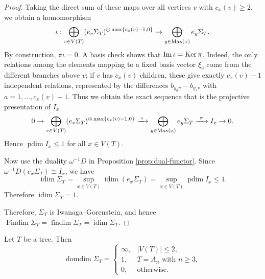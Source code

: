 \documentclass[a4paper,leqno]{amsart}
\begin{document}
\begin{proof}
Taking the direct sum of these maps over all vertices $v$ with $c_x(v)\geq 2$, we obtain a homomorphism
$$\iota:\bigoplus_{v\in V(T)} (e_v\Sigma_T)^{\oplus \max\{c_x(v)-1,0\}}\to
\bigoplus_{y\in \operatorname{Max}(x)}e_y\Sigma_T.$$
By construction, $\pi\iota=0$. A basis check shows that $\operatorname{Im}\iota=\operatorname{Ker}\pi$. Indeed, the only relations among the elements mapping to a fixed basis vector $\xi_v$ come from the different branches above $v$; if $v$ has $c_x(v)$ children, these give exactly $c_x(v)-1$ independent relations, represented by the differences $b_{y_av}-b_{y_sv}$ with $a=1,\dots,c_x(v)-1$.
Thus we obtain the exact sequence that is the projective presentation of $I_x$
$$0\to\bigoplus_{v\in V(T)} (e_v\Sigma_T)^{\oplus \max\{c_x(v)-1,0\}}
\xrightarrow{\ \iota\ }\bigoplus_{y\in \operatorname{Max}(x)} e_y\Sigma_T\xrightarrow{\ \pi\ }I_x\to 0.$$
Hence $\operatorname{pdim}I_x\leq 1$ for all $x\in V(T)$. 

Now use the duality $\omega^{-1}D$ in Proposition \ref{prop:dual-functor}. Since $\omega^{-1}D(e_x\Sigma_T)\cong I_x$, we have
$$ \operatorname{idim}\Sigma_T=\sup_{x\in V(T)}\operatorname{idim}(e_x\Sigma_T)=\sup_{x\in V(T)}\operatorname{pdim}I_x\leq 1.$$
Therefore $\operatorname{idim}\Sigma_T=1$.

Therefore, $\Sigma_T$ is Iwanaga--Gorenstein, and hence
$\operatorname{Findim} \Sigma_T=\operatorname{findim} \Sigma_T=\operatorname{idim}\Sigma_T$.
\end{proof}

\begin{prop}\label{prop:domdim Sigma tree}
Let $T$ be a tree. Then
$$
\operatorname{domdim} \Sigma_T=
\begin{cases}
\infty, & |V(T)|\leq 2,\\
1, & T=A_n\text{ with }n\geq 3,\\
0, & \text{otherwise}.
\end{cases}$$
\end{prop}
\end{document}
